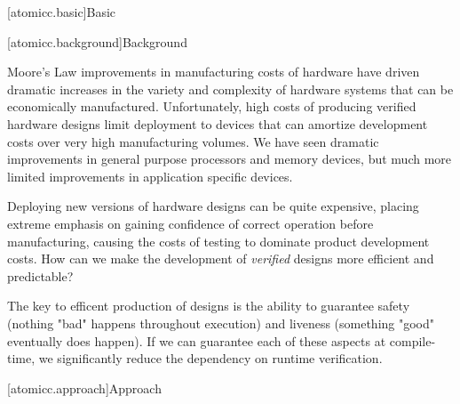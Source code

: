 [atomicc.basic]{Basic}

[atomicc.background]{Background}

Moore's Law improvements in manufacturing
costs of hardware have driven dramatic increases in the variety and complexity
of hardware systems that can be economically manufactured.
Unfortunately, high costs of producing verified hardware designs limit
deployment to devices that
can amortize development costs over very high manufacturing volumes.
We have seen dramatic improvements in general purpose processors
and memory devices, but much more limited improvements in application
specific devices.

Deploying new versions of hardware designs can be quite expensive,
placing extreme emphasis on gaining confidence of correct operation before
manufacturing, causing the costs of testing to
dominate product development costs.
How can we make the development of 
\textit{verified} designs more efficient and predictable?

The key to efficent production of designs is the ability to guarantee
safety (nothing "bad" happens throughout execution)
and liveness (something "good" eventually does happen).
If we can guarantee each of these aspects at compile-time,
we significantly reduce the dependency on runtime verification.

[atomicc.approach]{Approach}

